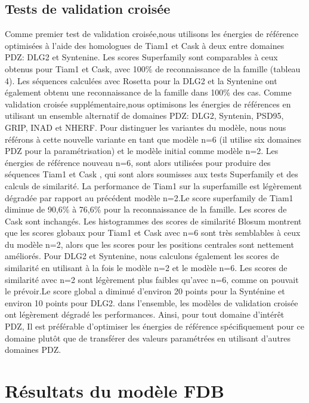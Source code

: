 \subsection{Tests de validation croisée}
Comme premier test de validation croisée,nous utilisons les énergies de référence optimisées à l'aide des homologues de Tiam1 et Cask à deux entre domaines PDZ: DLG2 et Syntenine. Les scores Superfamily sont comparables à ceux obtenus pour Tiam1 et Cask, avec 100\% de reconnaissance de la famille (tableau 4). Les séquences calculées avec Rosetta pour la DLG2 et la Syntenine ont également obtenu une reconnaissance  de la famille dans 100\% des cas. Comme validation croisée supplémentaire,nous optimisons les énergies de références en utilisant un ensemble alternatif de domaines PDZ: DLG2, Syntenin,
PSD95, GRIP, INAD et NHERF. Pour distinguer les variantes du modèle, nous nous référons à cette nouvelle variante en tant que modèle n=6 (il utilise six domaines PDZ pour la paramétrisation) et le modèle initial comme modèle n=2. Les énergies de référence  nouveau n=6,  sont alors utilisées pour produire des séquences Tiam1 et Cask , qui sont alors soumisses aux tests Superfamily et des calculs de similarité. La performance de Tiam1 sur la superfamille est légèrement dégradée par rapport au précédent modèle n=2.Le score superfamily de Tiam1 diminue de 90,6\% à 76,6\% pour la reconnaissance de la famille. Les scores de Cask sont inchangés. Les histogrammes des scores de similarité Blosum montrent que les scores globaux pour Tiam1 et Cask avec n=6 sont très semblables à ceux du modèle n=2, alors que les scores pour les positions centrales sont nettement améliorés. Pour DLG2 et Syntenine, nous calculons également les scores de similarité en utilisant à la fois le modèle n=2 et le modèle n=6. Les scores de similarité avec n=2 sont légèrement plus faibles qu'avec n=6, comme on pouvait le prévoir.Le score global a diminué d'environ 20 points pour la Synténine et environ 10 points pour DLG2. dans l'ensemble, les modèles de validation croisée ont légèrement dégradé les performances. Ainsi, pour tout domaine d'intérêt PDZ, Il est préférable d'optimiser les énergies de référence spécifiquement pour ce domaine plutôt que de transférer des valeurs paramétrées en utilisant d'autres domaines PDZ. 

\section{Résultats du modèle FDB}


